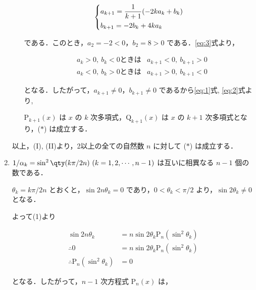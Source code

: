 \documentclass[a4paper]{ltjsarticle}
\begin{document}
\begin{enumerate}[label=(\arabic*)]
\begin{enumerate}[label=(\Roman*)]
                    \begin{equation}
                        \begin{dcases}
                            a_{k+1}=\dfrac{1}{k+1}(-2ka_k+b_k) \\
                            b_{k+1}=-2b_k+4ka_k
                        \end{dcases}\label{eq:3}
                    \end{equation}

                    である．このとき，$a_2=-2<0$，$b_2=8>0$ である．\eqref{eq:3}式より，

                    \begin{align*}
                         & a_k>0,\ b_k<0\text{ときは} & a_{k+1}<0,\ b_{k+1}>0 \\
                         & a_k<0,\ b_k>0\text{ときは} & a_{k+1}>0,\ b_{k+1}<0
                    \end{align*}

                    となる．したがって，$a_{k+1}\neq 0$，$b_{k+1}\neq 0$ であるから\eqref{eq:1}式, \eqref{eq:2}式より,

                    $\mathrm{P}_{k+1}(x)$ は $x$ の $k$ 次多項式，$\mathrm{Q}_{k+1}(x)$ は $x$ の $k+1$ 次多項式となり，($\ast$) は成立する．
          \end{enumerate}

          以上，(I), (II)より，2以上の全ての自然数 $n$ に対して ($\ast$) は成立する．

    \item $1/\alpha_k=\sin^2\qty(k\pi/2n)\ (k=1, 2, \cdots, n-1)$ は互いに相異なる $n-1$ 個の数である．

          $\theta_k=k\pi/2n$ とおくと，$\sin2n\theta_k=0$ であり，$0<\theta_k<\pi/2$ より，$\sin2\theta_k\neq0$ となる．

          よって(1)より

          \begin{align*}
              \sin 2n\theta_k                         & =n\sin{2\theta_k}\mathrm{P}_n(\sin^2\theta_k) \\
              \therefore 0                            & =n\sin{2\theta_k}\mathrm{P}_n(\sin^2\theta_k) \\
              \therefore \mathrm{P}_n(\sin^2\theta_k) & =0
          \end{align*}

          となる．したがって，$n-1$ 次方程式 $\mathrm{P}_n(x)$ は，


\end{enumerate}
\end{document}
